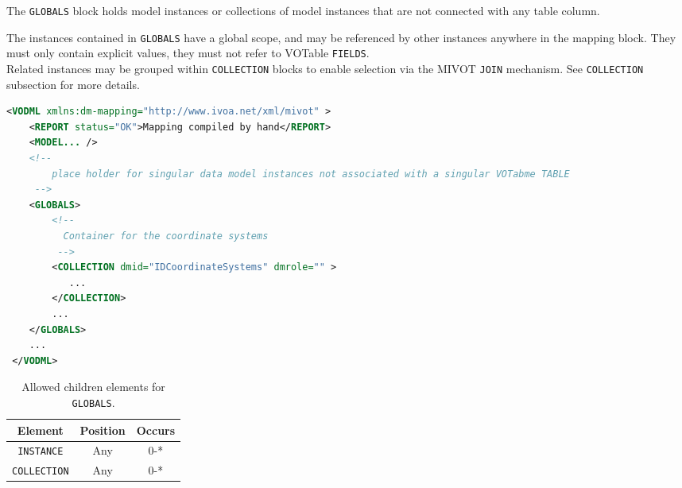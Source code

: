 The \texttt{GLOBALS} block holds model instances or collections of model instances 
that are not connected with any table column. 

The instances contained in \texttt{GLOBALS} have a global scope, and may be
referenced by other instances anywhere in the mapping block.  
They must only contain
explicit values, they must not refer to VOTable \texttt{FIELDS}.  \\ 

Related instances may be grouped within \texttt{COLLECTION} blocks to enable selection
via the MIVOT \texttt{JOIN} mechanism.  
See \texttt{COLLECTION} subsection for more details.

\begin{lstlisting}[caption={Example \texttt{GLOBALS} block (see line~\ref{GLOBALS_snippet} in Appendix A) which contains a collection of coordinate systems.},language=XML]
<VODML xmlns:dm-mapping="http://www.ivoa.net/xml/mivot" >
    <REPORT status="OK">Mapping compiled by hand</REPORT>
    <MODEL... />
    <!--	             
        place holder for singular data model instances not associated with a singular VOTabme TABLE
     -->
    <GLOBALS>
        <!--
          Container for the coordinate systems
         -->
        <COLLECTION dmid="IDCoordinateSystems" dmrole="" >
           ...
        </COLLECTION>
        ...
    </GLOBALS>
    ...
 </VODML>
\end{lstlisting}


\begin{table}[!htbp]
  \small
  \centering
  \begin{tabulary}{\linewidth}{|c |c |c|}
    \hline 
        \textbf{Element} &
        \textbf{Position} &
        \textbf{Occurs}\\
    \hline
    \hline
        \texttt{INSTANCE} &
        Any &
        0-*\\
    \hline
        \texttt{COLLECTION} &
        Any &
        0-*\\
    \hline
  \end{tabulary}
  \caption{Allowed children elements for \texttt{GLOBALS}.} 
  \label{tbl:globals-children}
 \end{table}
